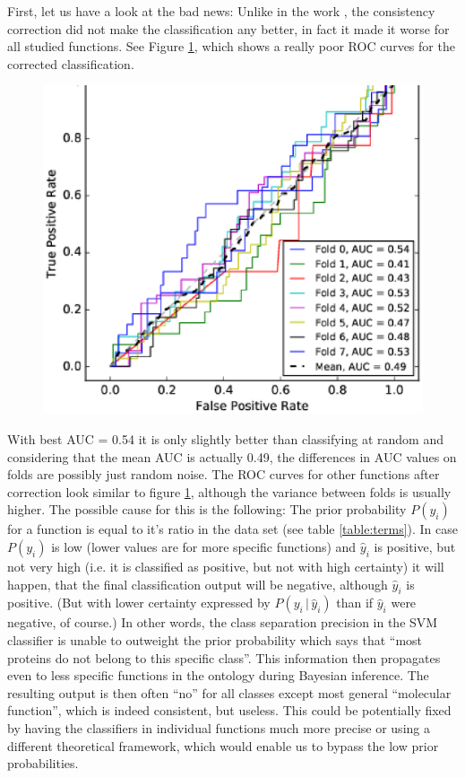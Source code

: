 \documentclass[11pt,twoside,a4paper]{book}
\begin{document}
First, let us have a look at the bad news: 
Unlike in the work \cite{bnet},
the consistency correction did not make the classification 
any better,
in fact it made it worse for all studied functions.
See Figure \ref{fig:roc_corrected}, which shows a really poor ROC curves
for the corrected classification.
\begin{figure}[h]\begin{center}\includegraphics[width=0.5\linewidth]{figures/binding-corrected}\label{fig:roc_corrected}\end{center}\end{figure}
With best AUC = 0.54 it is only slightly better than classifying at random
and considering that the mean AUC is actually 0.49,
the differences in AUC values on folds are possibly just random noise.
The ROC curves for other functions after correction look similar to figure \ref{fig:roc_corrected}, although the variance between folds is usually higher.
The possible cause for this is the following:
The prior probability $P(y_i)$ for a function is equal to it's ratio in the data set (see table \ref{table:terms}).
In case $P(y_i)$ is low (lower values are for more specific functions) and $\hat{y}_i$ is positive, but not very high
(i.e. it is classified as positive, but not with high certainty)
it will happen, that the final classification output will be negative,
although $\hat{y}_i$ is positive.
(But with lower certainty expressed by $P(y_i\, | \, \hat{y}_i)$ than if $\hat{y}_i$ were negative, of course.)
In other words, the class separation precision in the SVM classifier 
is unable to outweight the prior probability which says that ``most proteins do not belong to this specific class''.
This information then propagates even to less specific functions in the ontology during Bayesian inference.
The resulting output is then often ``no'' for all classes except most general ``molecular function'',
which is indeed consistent, but useless.
This could be potentially fixed by having the classifiers in individual functions much more precise
or using a different theoretical framework, which would enable us to bypass the low prior probabilities.
\end{document}
